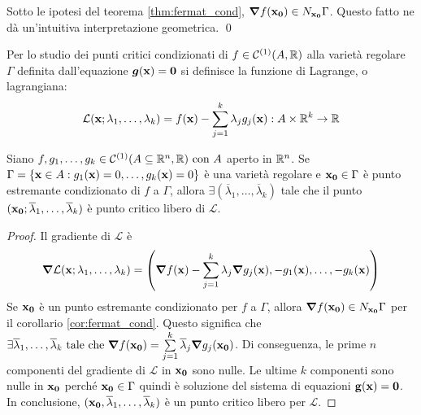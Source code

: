 \begin{corollary}\label{cor:fermat_cond}
    Sotto le ipotesi del teorema \ref{thm:fermat_cond}, $\grad f (\vb{x_0}) \in N_{\vb{x_0}}\Gamma$. Questo fatto ne dà un'intuitiva interpretazione geometrica.
    \qed
\end{corollary}

\begin{definition}
    Per lo studio dei punti critici condizionati di $f\in\mathcal{C}^{(1)}(A,\mathbb{R})$ alla varietà regolare $\Gamma$ definita dall'equazione $\bm g (\vb{x})=\vb{0}$ si definisce la funzione di Lagrange, o lagrangiana:
    $$
        \displaystyle \mathcal{L}(\vb{x};\lambda_1,\dots,\lambda_k)=f(\vb{x})-\sum_{j=1}^k \lambda_j g_j(\vb{x}) : A \times \mathbb{R}^k \to \mathbb{R}
    $$
\end{definition}

\begin{theorem}
    Siano $f,g_1,\dots,g_k \in \mathcal{C}^{(1)}(A\subseteq\mathbb{R}^n, \mathbb{R}) \text{ con } A$ aperto in $\mathbb{R}^n$. Se $\Gamma = \{ \vb{x} \in A: g_1 (\vb{x})=0, \dots, g_k(\vb{x})=0 \}$ è una varietà regolare e $\vb{x_0} \in \Gamma$ è punto estremante condizionato di $f$ a $\Gamma$, allora $\exists (\overline{\lambda}_1, \dots,\overline{\lambda}_k)$ tale che il punto $(\vb{x_0}; \overline{\lambda}_1,\dots,\overline{\lambda}_k)$ è punto critico libero di $\mathcal{L}$.
\end{theorem}

\begin{proof}
    Il gradiente di $\mathcal{L}$ è
    $$
        \grad \mathcal{L}(\vb{x};\lambda_1,\dots,\lambda_k)=\left(\grad f(\vb{x})-\sum_{j=1}^{k}\lambda_j\grad g_j(\vb{x}),-g_1(\vb{x}),\dots,-g_k(\vb{x})\right)
    $$
    Se $\vb{x_0}$ è un punto estremante condizionato per $f$ a $\Gamma$, allora $\grad f(\vb{x_0})\in N_{\vb{x_0}}\Gamma$ per il corollario \ref{cor:fermat_cond}. Questo significa che $\exists \overline{\lambda}_1,\dots,\overline{\lambda}_k \text{ tale che } \grad f(\vb{x_0}) = \sum\limits_{j=1}^k\overline{\lambda}_j\grad g_j(\vb{x_0})$. Di conseguenza, le prime $n$ componenti del gradiente di $\mathcal{L}$ in $\vb{x_0}$ sono nulle. Le ultime $k$ componenti sono nulle in $\vb{x_0}$ perché $\vb{x_0}\in\Gamma$ quindi è soluzione del sistema di equazioni $\vb{g}(\vb{x})=\vb{0}$.
    In conclusione, $(\vb{x_0},\overline{\lambda}_1,\dots,\overline{\lambda}_k)$ è un punto critico libero per $\mathcal{L}$.
\end{proof}

